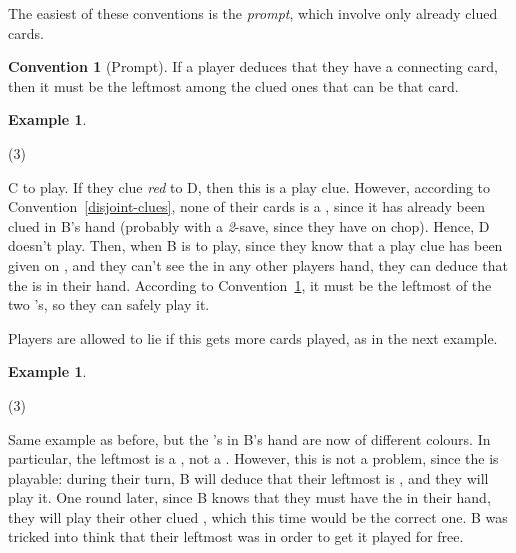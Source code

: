 \documentclass[a4paper]{article}
\theoremstyle{plain}
\theoremstyle{definition}
\newtheorem{example}[theorem]{Example}
\newtheorem{convention}[theorem]{Convention}
\begin{document}
The easiest of these conventions is the \textit{prompt}, which involve only already clued cards.

\begin{convention}[Prompt]
	\label{prompt}
	If a player deduces that they have a connecting card, then it must be the leftmost among the clued ones that can be that card.
\end{convention}

\begin{example}
	\hfill
	\begin{tasks}(3)
		\task[+]      
		\task[A]    
		\task[B]    
		\task[C]    
		\task[D]    
		\task[E]    
	\end{tasks}
	
	C to play. If they clue \textit{red} to D, then this is a play clue. However, according to Convention~\ref{disjoint-clues}, none of their cards is a , since it has already been clued in B's hand (probably with a \textit{2}-save, since they have  on chop). Hence, D doesn't play. Then, when B is to play, since they know that a play clue has been given on , and they can't see the  in any other players hand, they can deduce that the  is in their hand. According to Convention~\ref{prompt}, it must be the leftmost of the two 's, so they can safely play it.
\end{example}

Players are allowed to lie if this gets more cards played, as in the next example.

\begin{example}
	\hfill
	\begin{tasks}(3)
		\task[+]      
		\task[A]    
		\task[B]    
		\task[C]    
		\task[D]    
		\task[E]    
	\end{tasks}
	
	Same example as before, but the 's in B's hand are now of different colours. In particular, the leftmost is a , not a . However, this is not a problem, since the  is playable: during their turn, B will deduce that their leftmost  is , and they will play it. One round later, since B knows that they must have the  in their hand, they will play their other clued , which this time would be the correct one. B was tricked into think that their leftmost  was  in order to get it played for free.
\end{example}
\end{document}
